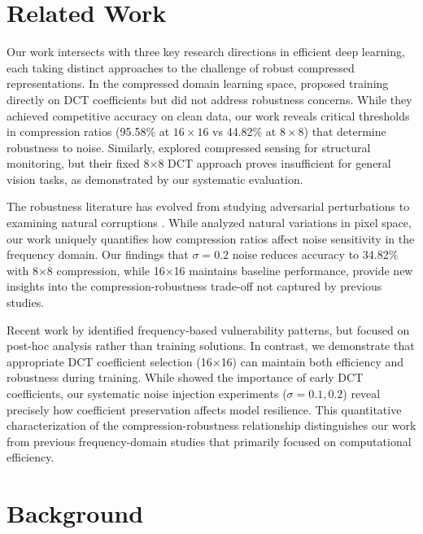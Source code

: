 \documentclass{article} %
\begin{document}
\section{Related Work}
\label{sec:related}

Our work intersects with three key research directions in efficient deep learning, each taking distinct approaches to the challenge of robust compressed representations. In the compressed domain learning space, \citet{wang2022learning} proposed training directly on DCT coefficients but did not address robustness concerns. While they achieved competitive accuracy on clean data, our work reveals critical thresholds in compression ratios (95.58\% at $16 \times 16$ vs 44.82\% at $8 \times 8$) that determine robustness to noise. Similarly, \citet{azimi2020structural} explored compressed sensing for structural monitoring, but their fixed 8$\times$8 DCT approach proves insufficient for general vision tasks, as demonstrated by our systematic evaluation.

The robustness literature has evolved from studying adversarial perturbations \citep{Szegedy2013IntriguingPO} to examining natural corruptions \citep{Hendrycks2019BenchmarkingNN}. While \citet{Zhong2021UnderstandingLR} analyzed natural variations in pixel space, our work uniquely quantifies how compression ratios affect noise sensitivity in the frequency domain. Our findings that $\sigma = 0.2$ noise reduces accuracy to 34.82\% with 8$\times$8 compression, while 16$\times$16 maintains baseline performance, provide new insights into the compression-robustness trade-off not captured by previous studies.

Recent work by \citet{Machiraju2023FrequencyBasedVA} identified frequency-based vulnerability patterns, but focused on post-hoc analysis rather than training solutions. In contrast, we demonstrate that appropriate DCT coefficient selection (16$\times$16) can maintain both efficiency and robustness during training. While \citet{Khan2022ExtractingTM} showed the importance of early DCT coefficients, our systematic noise injection experiments ($\sigma = 0.1, 0.2$) reveal precisely how coefficient preservation affects model resilience. This quantitative characterization of the compression-robustness relationship distinguishes our work from previous frequency-domain studies \citep{Mukhopadhyay2011ImageAV} that primarily focused on computational efficiency.

\section{Background}
\label{sec:background}
\end{document}
